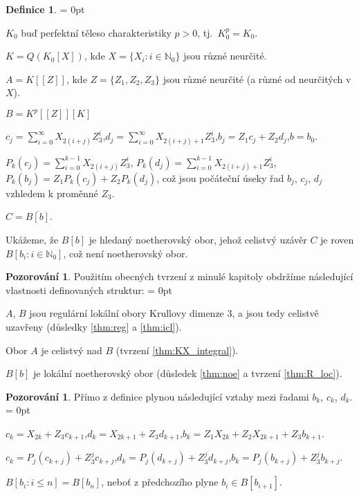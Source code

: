 \documentclass[11pt,a4paper]{article}
\newcommand\m[1]{\mathbb { #1 }} %
\newcommand\N{\m N}
\let \icl \overline %
\newenvironment{items}{%
	\itemize
	\itemsep = 0pt%
}{%
	\enditemize
}
\newcounter{numb}
\theoremstyle{definition}
\newtheorem*{definice}{Definice}
\newtheorem{pozorovani}[numb]{Pozorování}
\theoremstyle{plain}
\begin{document}
\begin{definice} \hfill
	\newcommand*{\I}{_{i = 0}^\infty}
	\newcommand*{\PI}{_{i = 0}^{k - 1}}

	\begin{items}
		\item $K_0$ buď perfektní těleso charakteristiky $p > 0$, tj.\ $K_0^p = K_0$.
		\item $K = Q(K_0[X])$, kde $X = \{X_i: i \in \N_0\}$ jsou různé neurčité.
		\item $A = K[[Z]]$, kde $Z = \{Z_1, Z_2, Z_3\}$ jsou různé neurčité (a různé od neurčitých v $X$).
		\item $B = K^p[[Z]][K]$
		\item $c_j = \sum\I X_{2(i + j)} Z_3^i$,\quad $d_j = \sum\I X_{2(i + j) + 1} Z_3^i$,\quad $b_j = Z_1 c_j + Z_2 d_j$,\quad $b = b_0$.
		\item $P_k(c_j) = \sum\PI X_{2(i + j)} Z_3^i$, $P_k(d_j) = \sum\PI X_{2(i + j) + 1} Z_3^i$, $P_k(b_j) = Z_1 P_k(c_j) + Z_2 P_k(d_j)$, což jsou počáteční úseky řad $b_j$, $c_j$, $d_j$ vzhledem k proměnné $Z_3$.
		\item $C = \icl{B[b]}$.
	\end{items}
\end{definice}

\newcommand*{\Ball}{B[b_i: i \in \N_0]} %
\newcommand*{\Bcdall}{B[c_i, d_i: i \in \N_0]}

Ukážeme, že $B[b]$ je hledaný noetherovský obor, jehož celistvý uzávěr $C$ je roven $B[b_i: i \in \N_0]$, což není noetherovský obor.

\begin{pozorovani}
	Použitím obecných tvrzení z minulé kapitoly obdržíme následující vlastnosti definovaných struktur:
	\begin{items}
		\item $A$, $B$ jsou regulární lokální obory Krullovy dimenze $3$, a jsou tedy celistvě uzavřeny (důsledky \ref{thm:reg} a \ref{thm:icl}).
		\item Obor $A$ je celistvý nad $B$ (tvrzení \ref{thm:KX_integral}).
		\item $B[b]$ je lokální noetherovský obor (důsledek \ref{thm:noe} a tvrzení \ref{thm:R_loc}).
	\end{items}
\end{pozorovani}

\begin{pozorovani} Přímo z definice plynou následující vztahy mezi řadami $b_k$, $c_k$, $d_k$.
	\begin{items}
		\item $c_k = X_{2k} + Z_3 c_{k + 1}$,\quad $d_k = X_{2k + 1} + Z_3 d_{k + 1}$,\quad $b_k = Z_1 X_{2k} + Z_2 X_{2k + 1} + Z_3 b_{k + 1}$.
		\item $c_k = P_j(c_{k + j}) + Z_3^j c_{k + j}$,\quad $d_k = P_j(d_{k + j}) + Z_3^j d_{k + j}$,\quad $b_k = P_j(b_{k + j}) + Z_3^j b_{k +j}$.
		\item $B[b_i: i \leq n] = B[b_n]$, neboť z předchozího plyne $b_i \in B[b_{i + 1}]$.
	\end{items}
\end{pozorovani}
\end{document}
